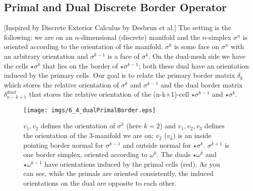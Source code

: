 \begin{appendix}

\chapter{Primal and Dual Discrete Border Operator}

[Inspired by Discrete Exterior Calculus by Desbrun et al.]
The setting is the following: we are on an $n$-dimensional (discrete) manifold and the $n$-simplex $\sigma^n$ is oriented according to the orientation of the manifold. $\sigma^k$ is some face on $\sigma^n$ with an arbitrary orientation and $\sigma^{k-1}$ is a face of $\sigma^k$. On the dual-mesh side we have the cells $\star \sigma^k$ that lies on the border of $\star \sigma^{k-1}$; both these dual have an orientation induced by the primary cells. Our goal is to relate the primary border matrix $\delta_k$ which stores the relative orientation of $\sigma^k$ and $\sigma^{k-1}$ 
and the dual border matrix $\delta_{n-k+1}^{dual}$ that stores the relative orientation of the (n-k+1)-cell $\star \sigma^{k-1}$ and $\star \sigma^{k}$.

\begin{figure}[h]
\begin{center}
\texttt{[image: imgs/6\_4\_dualPrimalBorder.eps]}
\end{center}
\caption{$v_1,v_2$ defines the orientation of $\sigma^k$ (here $k=2$) and $v_1,v_2,v_3$ defines the orientation of the 3-manifold we are on; $v_2$ ($v_k$) is an inside pointing border normal for $\sigma^{k-1}$ and outside normal for $\star \sigma^k$. $\sigma^{k+1}$ is one border simplex, oriented according to $\omega^k$. The duals $\star \omega^k$ and $\star \omega^{k-1}$ have orientations induced by the primal cells (red). As you can see, while the primals are oriented consistently, the induced orientations on the dual are opposite to each other.}
\end{figure}


\end{appendix}
